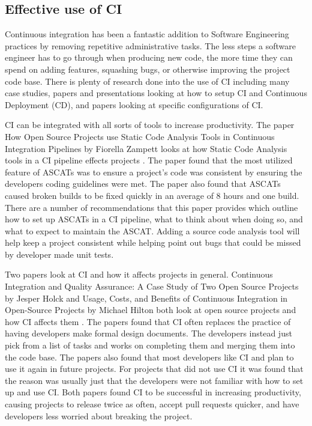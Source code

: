 \subsection{Effective use of CI}
	Continuous integration has been a fantastic addition to Software Engineering practices by removing repetitive administrative tasks. The less steps a software engineer has to go through when 
    producing new code, the more time they can spend on adding features, squashing bugs, or otherwise improving the project code base. There is plenty of research done into the use of CI 
    including many case studies, papers and presentations looking at how to setup CI and Continuous Deployment (CD), and papers looking at specific configurations of CI.
	
	CI can be integrated with all sorts of tools to increase productivity. The paper How Open Source Projects use Static Code Analysis Tools in Continuous Integration Pipelines by Fiorella Zampett 
    looks at how Static Code Analysis tools in a CI pipeline effects projects \cite{Zampetti}. The paper found that the most utilized feature of ASCATs was to ensure a project's code was consistent 
    by ensuring the developers coding guidelines were met. The paper also found that ASCATs caused broken builds to be fixed quickly in an average of 8 hours and one build. There are a number of 
    recommendations that this paper provides which outline how to set up ASCATs in a CI pipeline, what to think about when doing so, and what to expect to maintain the ASCAT. Adding a source code 
    analysis tool will help keep a project consistent while helping point out bugs that could be missed by developer made unit tests.

	Two papers look at CI and how it affects projects in general. Continuous Integration and Quality Assurance: A Case Study of Two Open Source Projects by Jesper Holck and Usage, Costs, and Benefits
    of Continuous Integration in Open-Source Projects by Michael Hilton both look at open source projects and how CI affects them \cite{Hilton,Holck}. The papers found that CI often replaces the 
    practice of having developers make formal design documents. The developers instead just pick from a list of tasks and works on completing them and merging them into the code base. The papers also
    found that most developers like CI and plan to use it again in future projects. For projects that did not use CI it was found that the reason was usually just that the developers were not 
    familiar with how to set up and use CI. Both papers found CI to be successful in increasing productivity, causing projects to release twice as often, accept pull requests quicker, and have 
    developers less worried about breaking the project. 

